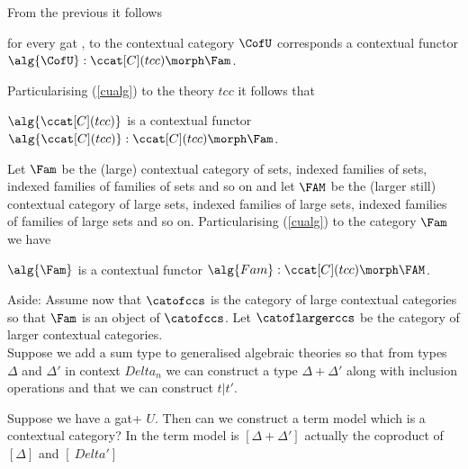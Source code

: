 \begin{tightquote}
\begin{oldtt}
\note
From the previous it follows 
\begin{pointeq}
\label{cualg}
for every gat \gat[U], to the contextual category $\CofU$ corresponds a contextual functor
   $\alg{\CofU} :\ccat[C](tcc) \morph \Fam$. \\
\end{pointeq} 

\note Particularising (\ref{cualg}) to the theory $tcc$ it follows that
\begin{pointeq}
  $\alg{\ccat[C](tcc)}$ is a contextual functor   $\alg{\ccat[C](tcc)} :\ccat[C](tcc) \morph \Fam$.
\end{pointeq}

\note
Let $\Fam$ be the (large) contextual category of sets, indexed families of sets, indexed families of families of sets and so on and
let $\FAM$ be the (larger still) contextual category of large sets, indexed families of large sets, indexed families of families of large sets and so on.
Particularising (\ref{cualg}) to the category $\Fam$ we have
\begin{pointeq}
  \label{inducedalgebra}
  $\alg{\Fam}$ is a contextual functor   $\alg{Fam} :\ccat[C](tcc) \morph \FAM$. 
\end{pointeq}
 
\note
Aside: Assume now that $\catofccs$ is the category of large contextual categories so that $\Fam$ is an object of $\catofccs$. 
Let $\catoflargerccs$ be the category of larger contextual categories. \\



\note Suppose we add a sum type to generalised algebraic theories so that from
types $\Delta$ and $\Delta'$ in context $Delta_n$ we can construct a type $\Delta + \Delta'$
along with inclusion operations and that we can construct $t | t'$. 

\note Suppose we have a gat+ $U$. Then can we construct a term model which is a contextual category?
In the term model is $[\Delta + \Delta']$ actually the coproduct of $[\Delta]$ and $[\
Delta'] $
\end{oldtt}


\end{tightquote}
